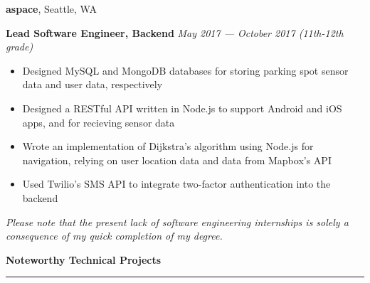 \documentclass[10pt]{article}
\begin{document}
\begin{flushleft}
		\vspace{-1.50mm}
		\textbf{aspace}, Seattle, WA\\
		\begin{leftli}
			{\small \textbf{Lead Software Engineer, Backend}} \hfill \textit{\small May 2017 --- October 2017 (11th-12th grade)}

			\begin{itemize}
				\item Designed MySQL and MongoDB databases for storing parking spot sensor data and user data, respectively
				\vspace{-2mm}
				\item Designed a RESTful API written in Node.js to support Android and iOS apps, and for recieving sensor data
				\vspace{-2mm}
				\item Wrote an implementation of Dijkstra's algorithm using Node.js for navigation, relying on user location data and data from Mapbox's API
				\vspace{-2mm}
				\item Used Twilio's SMS API to integrate two-factor authentication into the backend
			\end{itemize}
		\end{leftli}

		{\footnotesize \textit{Please note that the present lack of software engineering internships is solely a consequence of my quick completion of my degree.}}

		\vspace{1.25mm}
		{\large \raggedright \textbf{Noteworthy Technical Projects}}
		\vspace{1.25mm}
	
		\hrule
	

\end{flushleft}
\end{document}
